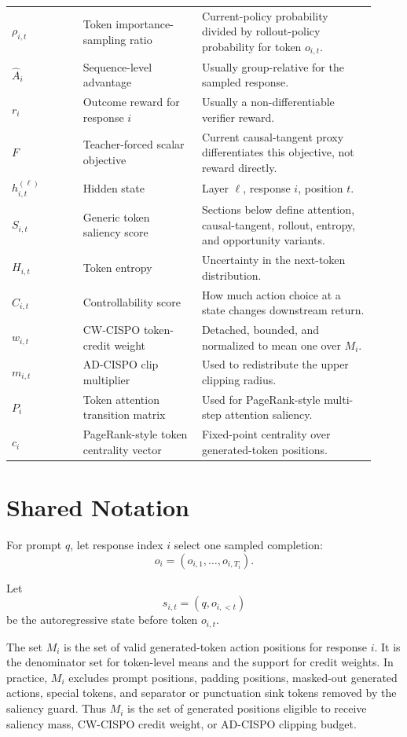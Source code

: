 \documentclass[11pt]{article}
\begin{document}
\begin{longtable}{>{\raggedright\arraybackslash}p{0.18\linewidth}p{0.30\linewidth}p{0.44\linewidth}}
$\rho_{i,t}$ & Token importance-sampling ratio & Current-policy probability divided by rollout-policy probability for token $o_{i,t}$. \\
$\hat A_i$ & Sequence-level advantage & Usually group-relative for the sampled response. \\
$r_i$ & Outcome reward for response $i$ & Usually a non-differentiable verifier reward. \\
$F$ & Teacher-forced scalar objective & Current causal-tangent proxy differentiates this objective, not reward directly. \\
$h^{(\ell)}_{i,t}$ & Hidden state & Layer $\ell$, response $i$, position $t$. \\
$S_{i,t}$ & Generic token saliency score & Sections below define attention, causal-tangent, rollout, entropy, and opportunity variants. \\
$H_{i,t}$ & Token entropy & Uncertainty in the next-token distribution. \\
$C_{i,t}$ & Controllability score & How much action choice at a state changes downstream return. \\
$w_{i,t}$ & CW-CISPO token-credit weight & Detached, bounded, and normalized to mean one over $M_i$. \\
$m_{i,t}$ & AD-CISPO clip multiplier & Used to redistribute the upper clipping radius. \\
$P_i$ & Token attention transition matrix & Used for PageRank-style multi-step attention saliency. \\
$c_i$ & PageRank-style token centrality vector & Fixed-point centrality over generated-token positions. \\
\bottomrule
\end{longtable}

\section*{Shared Notation}

For prompt $q$, let response index $i$ select one sampled completion:
\begin{equation}
  o_i = (o_{i,1}, \ldots, o_{i,T_i}).
\end{equation}

Let
\begin{equation}
  s_{i,t} = (q, o_{i,<t})
\end{equation}
be the autoregressive state before token $o_{i,t}$.

The set $M_i$ is the set of valid generated-token action positions for response
$i$. It is the denominator set for token-level means and the support for credit
weights. In practice, $M_i$ excludes prompt positions, padding positions,
masked-out generated actions, special tokens, and separator or punctuation sink
tokens removed by the saliency guard. Thus $M_i$ is the set of generated
positions eligible to receive saliency mass, CW-CISPO credit weight, or
AD-CISPO clipping budget.
\end{document}
